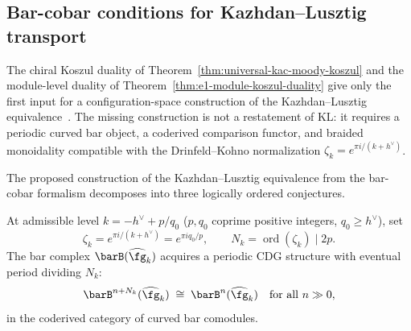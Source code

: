 \subsection{Bar-cobar conditions for Kazhdan--Lusztig transport}
\label{subsec:kl-from-bar-cobar}

The chiral Koszul duality of Theorem~\ref{thm:universal-kac-moody-koszul}
and the module-level duality of Theorem~\ref{thm:e1-module-koszul-duality}
give only the first input for a configuration-space construction of the
Kazhdan--Lusztig equivalence~\cite{KL93}.  The missing construction is
not a restatement of KL: it requires a periodic curved bar object, a
coderived comparison functor, and braided monoidality compatible with
the Drinfeld--Kohno normalization
\(\zeta_k=e^{\pi i/(k+h^\vee)}\).

\begin{remark}%
\label{rem:kl-correspondence}
The proposed construction of the Kazhdan--Lusztig equivalence from the
bar-cobar formalism decomposes into three logically ordered
conjectures.
\end{remark}

\begin{conjecture}\label{conj:kl-periodic-cdg}
At admissible level $k = -h^\vee + p/q_0$ ($p, q_0$ coprime positive integers,
$q_0 \geq h^\vee$), set
\[
\zeta_k=e^{\pi i/(k+h^\vee)}=e^{\pi i q_0/p},
\qquad
N_k=\operatorname{ord}(\zeta_k)\mid 2p.
\]
The bar complex $\barB(\widehat{\fg}_k)$ acquires a
periodic CDG structure with eventual period dividing $N_k$:
\[
\barB^{n+N_k}(\widehat{\fg}_k) \;\cong\; \barB^n(\widehat{\fg}_k)
\quad \text{for all } n \gg 0,
\]
in the coderived category of curved bar comodules.
\end{conjecture}

